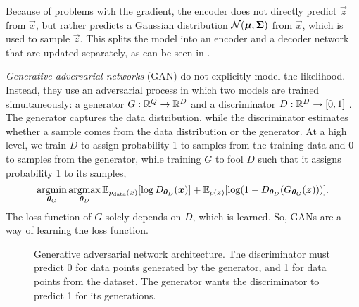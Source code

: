 Because of problems with the gradient, the encoder does not directly predict
$\vec{z}$ from $\vec{x}$, but rather predicts a Gaussian distribution
$\mathcal{N}(\bm{\mu},\bm{\Sigma})$ from $\vec{x}$, which is used to sample
$\vec{z}$. This splits the model into an encoder and a decoder network that are
updated separately, as can be seen in .

\textit{Generative adversarial networks} (GAN) do not explicitly model the
likelihood. Instead, they use an adversarial process in which two models are
trained simultaneously: a generator $G: \mathbb{R}^Q\to\mathbb{R}^D$ and a discriminator
$D:\mathbb{R}^D \to [0,1]$ \citep{goodfellow2014generative}. The generator captures the
data distribution, while the discriminator estimates whether a sample comes
from the data distribution or the generator. At a high level, we train $D$ to
assign probability 1 to samples from the training data and 0 to samples from
the generator, while training $G$ to fool $D$ such that it assigns probability
1 to its samples, \[
  \argmin_{\vec{\theta}_G}\argmax_{\vec{\theta}_D} \E_{p_{\text{data}}(\bm{x})}[\log D_{\vec{\theta}_D}(\vec{x})] + \E_{p(\vec{z})} \lft[ \log (1-D_{\vec{\theta}_D}(G_{\vec{\theta}_G}(\vec{z}))) \rgt]
.\]
The loss function of $G$ solely depends on $D$, which is learned. So, GANs
are a way of learning the loss function.

\begin{figure}[ht]
    \centering
    \caption{Generative adversarial network architecture. The discriminator must
    predict 0 for data points generated by the generator, and 1 for data points
    from the dataset. The generator wants the discriminator to predict 1 for its
    generations.}
    \label{fig:gan}
\end{figure}
